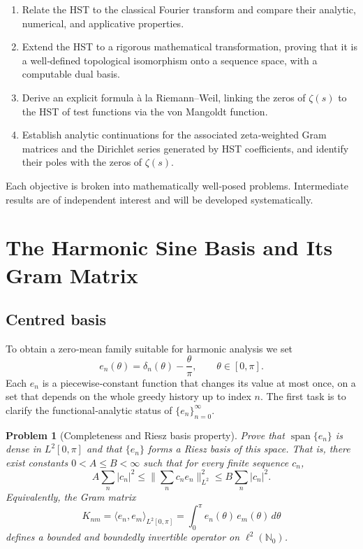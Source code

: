 \documentclass[11pt,a4paper]{article}
\newtheorem{problem}{Problem}[section]
\begin{document}
\begin{enumerate}[label=(\arabic*)]
    \item Relate the HST to the classical Fourier transform and compare their analytic, numerical, and applicative properties.
    \item Extend the HST to a rigorous mathematical transformation, proving that it is a well‑defined topological isomorphism onto a sequence space, with a computable dual basis.
    \item Derive an explicit formula à la Riemann–Weil, linking the zeros of \(\zeta(s)\) to the HST of test functions via the von Mangoldt function.
    \item Establish analytic continuations for the associated zeta‑weighted Gram matrices and the Dirichlet series generated by HST coefficients, and identify their poles with the zeros of \(\zeta(s)\).
\end{enumerate}

Each objective is broken into mathematically well‑posed problems. Intermediate results are of independent interest and will be developed systematically.

\section{The Harmonic Sine Basis and Its Gram Matrix}

\subsection{Centred basis}
To obtain a zero‑mean family suitable for harmonic analysis we set
\[
e_n(\theta) = \delta_n(\theta) - \frac{\theta}{\pi},\qquad \theta\in[0,\pi].
\]
Each \(e_n\) is a piecewise‑constant function that changes its value at most once, on a set that depends on the whole greedy history up to index \(n\).  
The first task is to clarify the functional‑analytic status of \(\{e_n\}_{n=0}^\infty\).

\begin{problem}[Completeness and Riesz basis property]
\label{prob:riesz}
Prove that \(\operatorname{span}\{e_n\}\) is dense in \(L^2[0,\pi]\) and that \(\{e_n\}\) forms a \emph{Riesz basis} of this space. That is, there exist constants \(0 < A \le B < \infty\) such that for every finite sequence \(c_n\),
\[
A\sum_n |c_n|^2 \le \Big\|\sum_n c_n e_n\Big\|_{L^2}^2 \le B\sum_n |c_n|^2 .
\]
Equivalently, the Gram matrix
\[
K_{nm} = \langle e_n, e_m\rangle_{L^2[0,\pi]} = \int_0^\pi e_n(\theta)\,e_m(\theta)\,d\theta
\]
defines a bounded and boundedly invertible operator on \(\ell^2(\mathbb{N}_0)\).
\end{problem}
\end{document}
